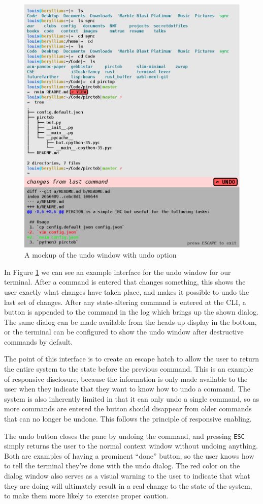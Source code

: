 \begin{figure}[H]
  \centering
  \includegraphics[width=0.8\linewidth]{figures/interface/undo.eps}
  \caption{A mockup of the undo window with undo option}
  \label{fig:undo}
\end{figure}

In Figure \ref{fig:undo} we can see an example interface for the undo window for
our terminal. After a command is entered that changes something, this shows the
user exactly what changes have taken place, and makes it possible to undo the
last set of changes. After any state-altering command is entered at the CLI, a
button is appended to the command in the log which brings up the shown
dialog. The same dialog can be made available from the heads-up display in the
bottom, or the terminal can be configured to show the undo window after
destructive commands by default.

The point of this interface is to create an escape hatch to allow the user to
return the entire system to the state before the previous command. This is an
example of responsive disclosure, because the information is only made available
to the user when they indicate that they want to know how to undo a command. The
system is also inherently limited in that it can only undo a single command, so
as more commands are entered the button should disappear from older commands
that can no longer be undone. This follows the principle of responsive enabling.

The undo button closes the pane by undoing the command, and pressing
\texttt{ESC} simply returns the user to the normal context window without
undoing anything. Both are examples of having a prominent ``done'' button, so
the user knows how to tell the terminal they're done with the undo dialog. The
red color on the dialog window also serves as a visual warning to the user to
indicate that what they are doing will ultimately result in a real change to the
state of the system, to make them more likely to exercise proper caution.
